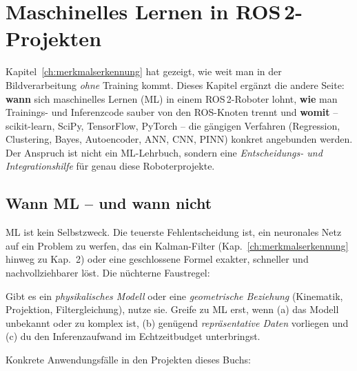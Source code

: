 
\chapter{Maschinelles Lernen in ROS\,2-Projekten}
\label{ch:machine_learning}

Kapitel~\ref{ch:merkmalserkennung} hat gezeigt, wie weit man in der
Bildverarbeitung \emph{ohne} Training kommt. Dieses Kapitel ergänzt die andere
Seite: \textbf{wann} sich maschinelles Lernen (ML) in einem ROS\,2-Roboter
lohnt, \textbf{wie} man Trainings- und Inferenzcode sauber von den ROS-Knoten
trennt und \textbf{womit} -- scikit-learn, SciPy, TensorFlow, PyTorch -- die
gängigen Verfahren (Regression, Clustering, Bayes, Autoencoder, ANN, CNN, PINN)
konkret angebunden werden. Der Anspruch ist nicht ein ML-Lehrbuch, sondern eine
\emph{Entscheidungs- und Integrationshilfe} für genau diese Roboterprojekte.

\section{Wann ML -- und wann nicht}
ML ist kein Selbstzweck. Die teuerste Fehlentscheidung ist, ein neuronales Netz
auf ein Problem zu werfen, das ein Kalman-Filter (Kap.~\ref{ch:merkmalserkennung}
hinweg zu Kap.~2) oder eine geschlossene Formel exakter, schneller und
nachvollziehbarer löst. Die nüchterne Faustregel:

\begin{infobox}[title={Faustregel: klassisch vor lernend}]
Gibt es ein \emph{physikalisches Modell} oder eine \emph{geometrische
Beziehung} (Kinematik, Projektion, Filtergleichung), nutze sie. Greife zu ML
erst, wenn (a) das Modell unbekannt oder zu komplex ist, (b) genügend
\emph{repräsentative Daten} vorliegen und (c) du den Inferenzaufwand im
Echtzeitbudget unterbringst.
\end{infobox}

\noindent Konkrete Anwendungsfälle in den Projekten dieses Buchs:

